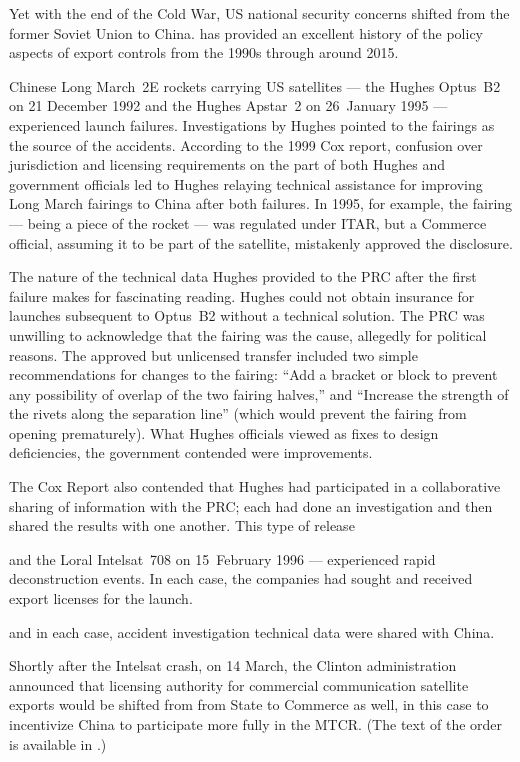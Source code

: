 \documentclass[12pt]{olfmemo}
\begin{document}
Yet with the end of the Cold War, US national security concerns shifted from the former Soviet Union to China. \citet{Zinger2015} has provided an excellent history of the policy aspects of export controls from the 1990s through around 2015.

Chinese Long March~2E rockets carrying US satellites --- the Hughes Optus~B2 on 21 December 1992 and the Hughes Apstar~2 on 26~January 1995 --- experienced launch failures. Investigations by Hughes pointed to the fairings as the source of the accidents. According to the 1999 Cox report, confusion over jurisdiction and licensing requirements on the part of both Hughes and government officials led to Hughes relaying technical assistance for improving Long March fairings to China after both failures. In 1995, for example, the fairing --- being a piece of the rocket --- was regulated under ITAR, but a Commerce official, assuming it to be part of the satellite, mistakenly approved the disclosure. \citep{Cox1999}

The nature of the technical data Hughes provided to the PRC after the first failure makes for fascinating reading. Hughes could not obtain insurance for launches subsequent to Optus~B2 without a technical solution. The PRC was unwilling to acknowledge that the fairing was the cause, allegedly for political reasons. The approved but unlicensed transfer included two simple recommendations for changes to the fairing: ``Add a bracket or block to prevent any possibility of overlap of the two fairing halves,'' and ``Increase the strength of the rivets along the separation line'' (which would prevent the fairing from opening prematurely). What Hughes officials viewed as fixes to design deficiencies, the government contended were improvements. \citep{Cox1999}

The Cox Report also contended that Hughes had participated in a collaborative sharing of information with the PRC; each had done an investigation and then shared the results with one another. This type of release 

 and the Loral Intelsat~708 on 15~February 1996 --- experienced rapid deconstruction events. In each case, the companies had sought and received export licenses for the launch. 

and in each case, accident investigation technical data were shared with China.

Shortly after the Intelsat crash, on 14 March, the Clinton administration announced that licensing authority for commercial communication satellite exports would be shifted from from State to Commerce as well, in this case to incentivize China to participate more fully in the MTCR. (The text of the order is available in \citet{State61FR56894_1996}.)
\end{document}
